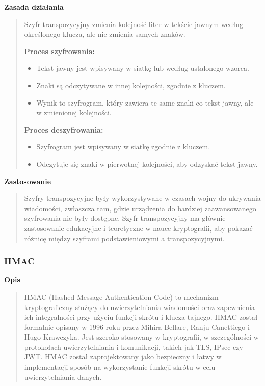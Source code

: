\documentclass[12pt,a4paper]{article}
\begin{document}
\noindent\textbf{Zasada działania}
\begin{quotation}\noindent Szyfr transpozycyjny zmienia kolejność liter w tekście jawnym według określonego klucza, ale nie zmienia samych znaków.\newline

\noindent\textbf{Proces szyfrowania:}
\begin{itemize}
\item Tekst jawny jest wpisywany w siatkę lub według ustalonego wzorca.
\item Znaki są odczytywane w innej kolejności, zgodnie z kluczem.
\item Wynik to szyfrogram, który zawiera te same znaki co tekst jawny, ale w zmienionej kolejności.
\end{itemize}

\noindent\textbf{Proces deszyfrowania:}
\begin{itemize}
\item Szyfrogram jest wpisywany w siatkę zgodnie z kluczem.
\item Odczytuje się znaki w pierwotnej kolejności, aby odzyskać tekst jawny.
\end{itemize}
\end{quotation}

\noindent\textbf{Zastosowanie}
\begin{quotation}\noindent  Szyfry transpozycyjne były wykorzystywane w czasach wojny do ukrywania wiadomości, zwłaszcza tam, gdzie urządzenia do bardziej zaawansowanego szyfrowania nie były dostępne. Szyfr transpozycyjny ma głównie zastosowanie edukacyjne i teoretyczne w nauce kryptografii, aby pokazać różnicę między szyframi podstawieniowymi a transpozycyjnymi.
\end{quotation}


\subsubsection{HMAC}
\noindent\textbf{Opis}
\begin{quotation}\noindent HMAC (Hashed Message Authentication Code) to mechanizm kryptograficzny służący do uwierzytelniania wiadomości oraz zapewnienia ich integralności przy użyciu funkcji skrótu i klucza tajnego. HMAC został formalnie opisany w 1996 roku przez Mihira Bellare, Ranju Canettiego i Hugo Krawczyka. Jest szeroko stosowany w kryptografii, w szczególności w protokołach uwierzytelniania i komunikacji, takich jak TLS, IPsec czy JWT. HMAC został zaprojektowany jako bezpieczny i łatwy w implementacji sposób na wykorzystanie funkcji skrótu w celu uwierzytelniania danych.
\end{quotation}
\end{document}
